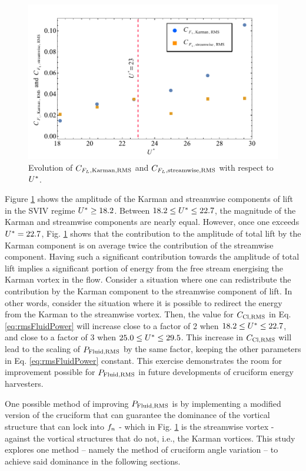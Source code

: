\documentclass[oneside]{utmthesis}
\begin{document}
\begin{figure}
  \centering
  \includegraphics[width=1\textwidth]{figs/karmanStreamwiseComponents}
  \caption{Evolution of $C_{F_{L},\text{Karman},\text{RMS}}$ and $C_{F_{L},\text{streamwise},\text{RMS}}$ with respect to $U^{*}$.}
  \label{fig:karmanStreamwiseComponents}
\end{figure}

Figure \ref{fig:karmanStreamwiseComponents} shows the \rms{} amplitude of the Karman and streamwise components of lift in the SVIV regime $U^{*} \geq 18.2$. Between $18.2 \leq U^{*} \leq 22.7$, the magnitude of the Karman and streamwise components are nearly equal. However, once one exceeds $U^{*} = 22.7$, Fig. \ref{fig:karmanStreamwiseComponents} shows that the contribution to the \rms{} amplitude of total lift by the Karman component is on average twice the contribution of the streamwise component. Having such a significant contribution towards the \rms{} amplitude of total lift implies a significant portion of energy from the free stream energising the Karman vortex in the flow. Consider a situation where one can redistribute the contribution by the Karman component to the streamwise component of lift. In other words, consider the situation where it is possible to redirect the energy from the Karman to the streamwise vortex. Then, the value for $C_{\text{Cl},\text{RMS}}$ in Eq. \ref{eq:rmsFluidPower} will increase close to a factor of 2 when $18.2 \leq U^{*} \leq 22.7$, and close to a factor of 3 when $25.0 \leq U^{*} \leq 29.5$. This increase in $C_{\text{Cl},\text{RMS}}$ will lead to the scaling of $P_{\text{Fluid,RMS}}$ by the same factor, keeping the other parameters in Eq. \ref{eq:rmsFluidPower} constant. This exercise demonstrates the room for improvement possible for $P_{\text{Fluid,RMS}}$ in future developments of cruciform energy harvesters.

One possible method of improving $P_{\text{Fluid,RMS}}$ is by implementing a modified version of the cruciform that can guarantee the dominance of the vortical structure that can lock into $f_{n}$ - which in Fig. \ref{fig:karmanStreamwiseComponents} is the streamwise vortex - against the vortical structures that do not, i.e., the Karman vortices. This study explores one method -- namely the method of cruciform angle variation -- to achieve said dominance in the following sections.
\end{document}
